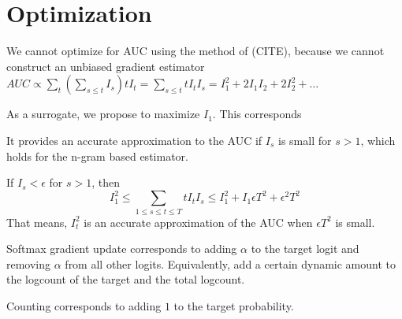 \documentclass[11pt,letterpaper]{article}
\begin{document}
\section{Optimization}
We cannot optimize for AUC using the method of (CITE), because we cannot construct an unbiased gradient estimator
$AUC \propto \sum_{t} (\sum_{s \leq t} I_s) tI_t = \sum_{s \leq t}  tI_t I_s = I_1^2 + 2 I_1 I_2 + 2 I_2^2 + \dots$



As a surrogate, we propose to maximize $I_1$.
This corresponds

It provides an accurate approximation to the AUC if $I_s$ is small for $s > 1$, which holds for the n-gram based estimator.

If $I_s < \epsilon$ for $s > 1$, then 
\begin{equation}
	I_1^2 \leq \sum_{1\leq s \leq t \leq T}  tI_t I_s \leq I_1^2 + I_1 \epsilon T^2 + \epsilon^2 T^2
\end{equation}
That means, $I_t^2$ is an accurate approximation of the AUC when $\epsilon T^2$ is small.


Softmax gradient update corresponds to adding $\alpha$ to the target logit and removing $\alpha$ from all other logits.
Equivalently, add a certain dynamic amount to the logcount of the target and the total logcount.



Counting corresponds to adding $1$ to the target probability. 







\end{document}
